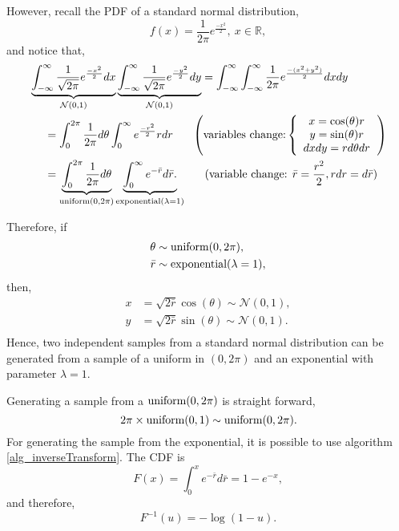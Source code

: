 However, recall the PDF of a standard normal distribution,
$$
  f(x) = \frac{1}{2\pi} e^{\frac{-x^2}{2}}, \ x \in \mathbb{R},%
$$
and notice that,
\begin{equation*}
\begin{aligned}
  &\underbrace{\int_{-\infty}^{\infty} \frac{1}{\sqrt{2\pi}} e^{\frac{-x^2}{2}} dx}_{\mathcal{N}(0,1)}
  \underbrace{\int_{-\infty}^{\infty} \frac{1}{\sqrt{2\pi}} e^{\frac{-y^2}{2}} dy}_{\mathcal{N}(0,1)}
  = \int_{-\infty}^{\infty}\int_{-\infty}^{\infty} \frac{1}{2\pi} e^{\frac{-(x^2+y^2)}{2}} dxdy \\
  & \ \ \ \ = \int_{0}^{2\pi} \frac{1}{2\pi} d\theta \int_{0}^{\infty} e^{\frac{-r^2}{2}}rdr 
  \ \ \ \ \ \left( \text{variables change:} 
            \left\{ \begin{array}{c}
              x = \cos(\theta)r  \\
              y = \sin(\theta)r  \\
              dxdy = rd\theta dr \\
            \end{array} \right.
            \right) \\
  & \ \ \ \ = \underbrace{\int_{0}^{2\pi} \frac{1}{2\pi} d\theta}_{\textup{uniform}(0,2\pi)} 
  \underbrace{\int_{0}^{\infty}e^{-\bar{r}}d\bar{r}.}_{\textup{exponential}(\lambda=1)}
  \ \ \ \ \ \text{(variable change: $\bar{r} = \frac{r^2}{2}, rdr = d\bar{r}$)} \\
\end{aligned}
\end{equation*}

Therefore, if
$$
 \begin{aligned}
  \theta  &\sim \textup{uniform}(0,2\pi), \\
  \bar{r} &\sim \textup{exponential}(\lambda = 1), \\
 \end{aligned}
$$
then,
$$
  \begin{aligned}
    x &= \sqrt{2\bar{r}}\cos(\theta) \sim \mathcal{N}(0,1), \\
    y &= \sqrt{2\bar{r}}\sin(\theta) \sim \mathcal{N}(0,1).  \\
  \end{aligned}
$$
Hence, two independent samples from a standard normal distribution can be generated from a sample of a uniform in $(0,2\pi)$ and an exponential with parameter $\lambda=1$.

Generating a sample from a $\textup{uniform}(0,2\pi)$ is straight forward,
$$
  2\pi \times \textup{uniform}(0,1) \sim \textup{uniform}(0,2\pi).
$$
For generating the sample from the exponential, it is possible to use algorithm \ref{alg_inverseTransform}. The CDF is
$$
  F(x) = \int_0^x e^{-\bar{r}}d\bar{r} = 1-e^{-x},
$$
and therefore,
$$
  F^{-1}(u) = -\log(1-u).
$$

